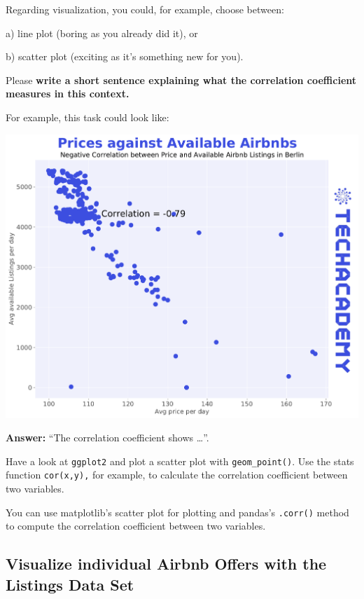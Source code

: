 \documentclass[
  11pt,
]{article}
\newenvironment{tips}[1]
  {
  \begin{itemize}
  \footnotesize
  \renewcommand{\labelitemi}{
    \raisebox{-.7\height}[0pt][0pt]{
      {\setkeys{Gin}{width=3em,keepaspectratio}
        \texttt{[image: images/\#1.png]}}
    }
  }
  \setlength{\fboxsep}{1em}
  \begin{rbox}
  \item
  }
  {
  \end{rbox}
  \end{itemize}
  }
\newenvironment{tipsp}[1]
  {
  \begin{itemize}
  \footnotesize
  \renewcommand{\labelitemi}{
    \raisebox{-.7\height}[0pt][0pt]{
      {\setkeys{Gin}{width=3em,keepaspectratio}
        \texttt{[image: images/\#1.png]}}
    }
  }
  \setlength{\fboxsep}{1em}
  \begin{pbox}
  \item
  }
  {
  \end{pbox}
  \end{itemize}
  }
\begin{document}
Regarding visualization, you could, for example, choose between:

a) line plot (boring as you already did it), or

b) scatter plot (exciting as it's something new for you).

Please \textbf{write a short sentence explaining what the correlation coefficient measures in this context.}

For example, this task could look like:

\begin{center}\includegraphics[width=1\linewidth]{plot/01_python/corr_availability_price} \end{center}

\textbf{Answer:} ``The correlation coefficient shows \ldots{}''.

\begin{tips}r
Have a look at \texttt{ggplot2} and plot a scatter plot with \texttt{geom\_point()}.
Use the stats function \texttt{cor(x,y),} for example, to calculate the correlation coefficient between two variables.

\end{tips}

\begin{tipsp}p
You can use matplotlib's scatter plot for plotting and pandas's \texttt{.corr()} method to compute the correlation coefficient between two variables.

\end{tipsp}

\hypertarget{visualize-individual-airbnb-offers-with-the-listings-data-set}{%
\subsection{Visualize individual Airbnb Offers with the Listings Data Set}\label{visualize-individual-airbnb-offers-with-the-listings-data-set}}
\end{document}
